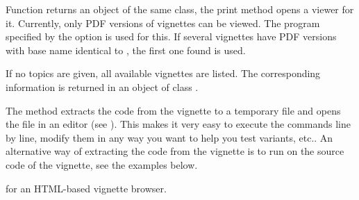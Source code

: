 %
\begin{Details}\relax
Function  returns an object of the same class, the
print method opens a viewer for it.
Currently, only PDF versions of vignettes can be viewed.
The program specified by the  option is used for this.
If several vignettes have PDF versions with base name identical to
, the first one found is used.

If no topics are given, all available vignettes are listed.  The
corresponding information is returned in an object of class
.

The  method
extracts the \R{} code from the vignette to a temporary file and
opens the file in an editor (see ). This makes it
very easy to execute the commands line by line, modify them in any way
you want to help you test variants, etc.. An alternative way of
extracting the \R{} code from the vignette is to run
 on the source code of the vignette,
see the examples below.
\end{Details}
%
\begin{SeeAlso}\relax
{} for an HTML-based vignette browser.
\end{SeeAlso}
%
\begin{Examples}
\end{Examples}

